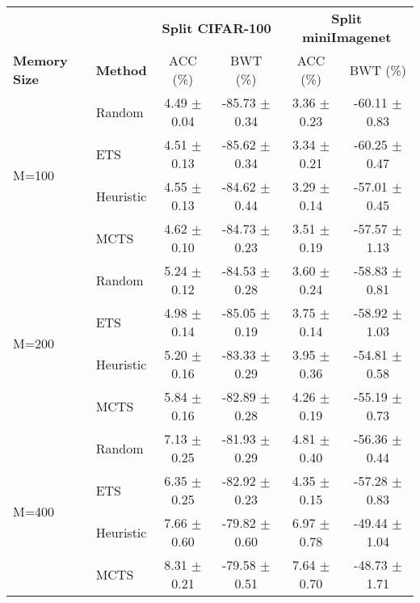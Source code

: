 \begin{tabular}{llcccc}
\toprule
                        &                 & \multicolumn{2}{c}{\textbf{Split CIFAR-100}} & \multicolumn{2}{c}{\textbf{Split miniImagenet}} \\
\cmidrule(lr){3-4} \cmidrule(lr){5-6}
\textbf{Memory Size}    & \textbf{Method} & ACC (\%)             & BWT (\%)              & ACC (\%)               & BWT (\%)               \\
\midrule
\multirow{4}{*}{M=100}  & Random          & 4.49 $\pm$ 0.04        & -85.73 $\pm$ 0.34       & 3.36 $\pm$ 0.23          & -60.11 $\pm$ 0.83        \\
                        & ETS             & 4.51 $\pm$ 0.13        & -85.62 $\pm$ 0.34       & 3.34 $\pm$ 0.21          & -60.25 $\pm$ 0.47        \\
                        & Heuristic         & 4.55 $\pm$ 0.13        & -84.62 $\pm$ 0.44       & 3.29 $\pm$ 0.14          & -57.01 $\pm$ 0.45        \\
                        & MCTS            & 4.62 $\pm$ 0.10        & -84.73 $\pm$ 0.23       & 3.51 $\pm$ 0.19          & -57.57 $\pm$ 1.13        \\
\midrule
\multirow{4}{*}{M=200}  & Random          & 5.24 $\pm$ 0.12        & -84.53 $\pm$ 0.28       & 3.60 $\pm$ 0.24          & -58.83 $\pm$ 0.81        \\
                        & ETS             & 4.98 $\pm$ 0.14        & -85.05 $\pm$ 0.19       & 3.75 $\pm$ 0.14          & -58.92 $\pm$ 1.03        \\
                        & Heuristic         & 5.20 $\pm$ 0.16        & -83.33 $\pm$ 0.29       & 3.95 $\pm$ 0.36          & -54.81 $\pm$ 0.58        \\
                        & MCTS            & 5.84 $\pm$ 0.16        & -82.89 $\pm$ 0.28       & 4.26 $\pm$ 0.19          & -55.19 $\pm$ 0.73        \\
\midrule
\multirow{4}{*}{M=400}  & Random          & 7.13 $\pm$ 0.25        & -81.93 $\pm$ 0.29       & 4.81 $\pm$ 0.40          & -56.36 $\pm$ 0.44        \\
                        & ETS             & 6.35 $\pm$ 0.25        & -82.92 $\pm$ 0.23       & 4.35 $\pm$ 0.15          & -57.28 $\pm$ 0.83        \\
                        & Heuristic         & 7.66 $\pm$ 0.60        & -79.82 $\pm$ 0.60       & 6.97 $\pm$ 0.78          & -49.44 $\pm$ 1.04        \\
                        & MCTS            & 8.31 $\pm$ 0.21        & -79.58 $\pm$ 0.51       & 7.64 $\pm$ 0.70          & -48.73 $\pm$ 1.71        \\

\end{tabular}
